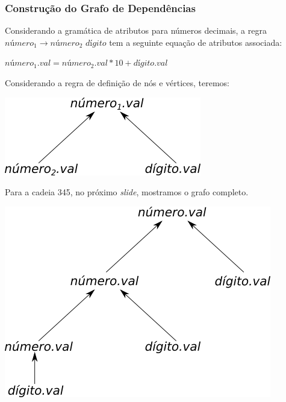 \documentclass[table]{beamer}
\begin{document}
\begin{frame}
   \frametitle{Construção do Grafo de Dependências}
   Considerando a gramática de atributos para números decimais, a regra $\textit{número}_{1}\to\textit{número}_{2}\textit{ dígito}$
tem a seguinte equação de atributos associada:
   \begin{center}
   $\textit{número}_{1}.val = \textit{número}_{2}.val * 10 + \textit{dígito}.val$
   \end{center}
   Considerando a regra de definição de nós e vértices, teremos:
   \begin{center}
   \includegraphics[scale=0.6]{figuras/exemplo66.png}
   \end{center}
   Para a cadeia 345, no próximo \textit{slide}, mostramos o grafo completo.
\end{frame}

\begin{frame}
   \includegraphics[width=\linewidth,height=\textheight,keepaspectratio]{figuras/exemplo66completo.png}
\end{frame}
\end{document}
